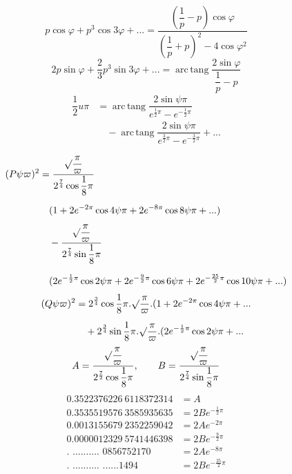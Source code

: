 \[
p\cos\varphi+p^3\cos3\varphi+\mathord{.}\mathord{.}\mathord{.}
=\dfrac{(\dfrac1p-p)\cos\varphi}{(\dfrac1p+p)^2-4\cos\varphi^2}
\]
\[
2p\sin\varphi+\dfrac23p^3\sin3\varphi+\mathord{.}\mathord{.}\mathord{.}
=\operatorname{arc\,tang}\dfrac{2\sin\varphi}{\dfrac1p-p}
\]
\[
\begin{aligned}\dfrac12u\pi
&=\operatorname{arc\,tang}\dfrac{2\sin\psi\pi}{e^{\frac12\pi}-e^{-\frac12\pi}}
\\[7pt]&\quad{}-\operatorname{arc\,tang}\dfrac{2\sin\psi\pi}{e^{\frac32\pi}-e^{-\frac32\pi}}+\mathord{.}\mathord{.}\mathord{.}\end{aligned}
\]




\[
\begin{aligned}
(P\psi\varpi)^2
&=\dfrac{\surd\dfrac\pi\varpi}{2^{\frac74}\cos\dfrac18\pi}
\\[6pt]&\quad{}(1+2e^{-2\pi}\cos4\psi\pi+2e^{-8\pi}\cos8\psi\pi+\mathord{.}\mathord{.}\mathord{.})\\[4pt]
&\quad-\dfrac{\surd\dfrac\pi\varpi}{2^{\frac74}\sin\dfrac18\pi}
\\[7pt]&\quad{}(2e^{-\frac12\pi}\cos2\psi\pi+2e^{-\frac92\pi}\cos6\psi\pi
+2e^{-\frac{25}2\pi}\cos10\psi\pi+\mathord{.}\mathord{.}\mathord{.})
\end{aligned}
\]
\[
\begin{aligned}
(Q\psi\varpi)^2
&=2^{\frac34}\cos\dfrac18\pi.\surd\dfrac\pi\varpi.
(1+2e^{-2\pi}\cos4\psi\pi+\mathord{.}\mathord{.}\mathord{.}\\[5pt]
&\quad+2^{\frac34}\sin\dfrac18\pi.\surd\dfrac\pi\varpi.
(2e^{-\frac12\pi}\cos2\psi\pi+\mathord{.}\mathord{.}\mathord{.}
\end{aligned}
\]
\[
A=\dfrac{\surd\dfrac\pi\varpi}{2^{\frac72}\cos\dfrac18\pi},
\qquad
B=\dfrac{\surd\dfrac\pi\varpi}{2^{\frac74}\sin\dfrac18\pi}
\]
\[
\begin{aligned}
0.3522376226\ 6118372314&=A\\[5pt]
0.3535519576\ 3585935635&=2Be^{-\frac12\pi}\\[5pt]
0.0013155679\ 2352259042&=2Ae^{-2\pi}\\[5pt]
0.0000012329\ 5741446398&=2Be^{-\frac92\pi}\\[5pt]
\text{. .......... 0856752170}&=2Ae^{-8\pi}\\[5pt]
\text{. .......... ......1494}&=2Be^{-\frac{25}2\pi}
\end{aligned}
\]
\clearpage
\endgroup
